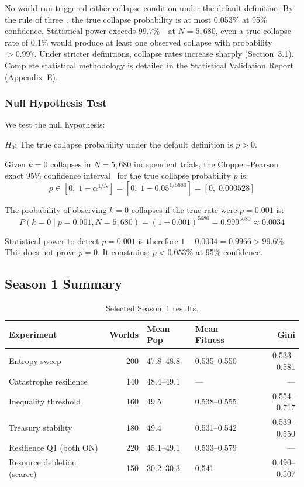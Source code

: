 \documentclass[11pt,a4paper]{article}
\begin{document}
No world-run triggered either collapse condition under the default definition. By the rule of three~\citep{jovanovic1997look}, the true collapse probability is at most 0.053\% at 95\% confidence. Statistical power exceeds 99.7\%---at $N = 5{,}680$, even a true collapse rate of 0.1\% would produce at least one observed collapse with probability $> 0.997$. Under stricter definitions, collapse rates increase sharply (Section~3.1). Complete statistical methodology is detailed in the Statistical Validation Report (Appendix~E).

\subsubsection{Null Hypothesis Test}

We test the null hypothesis:

\medskip
\noindent $H_0$: The true collapse probability under the default definition is $p > 0$.

\medskip
\noindent Given $k = 0$ collapses in $N = 5{,}680$ independent trials, the Clopper--Pearson exact 95\% confidence interval~\citep{clopper1934use} for the true collapse probability $p$ is:
\begin{equation}
  p \in [0,\; 1 - \alpha^{1/N}] = [0,\; 1 - 0.05^{1/5680}] = [0,\; 0.000528]
\end{equation}

The probability of observing $k = 0$ collapses if the true rate were $p = 0.001$ is:
\begin{equation}
  P(k = 0 \mid p = 0.001, N = 5{,}680) = (1 - 0.001)^{5680} = 0.999^{5680} \approx 0.0034
\end{equation}

Statistical power to detect $p = 0.001$ is therefore $1 - 0.0034 = 0.9966 > 99.6\%$. This does not prove $p = 0$. It constrains: $p < 0.053\%$ at 95\% confidence.

\subsection{Season 1 Summary}

\begin{table}[H]
\centering
\caption{Selected Season~1 results.}
\small
\begin{tabular}{@{}lrllr@{}}
\toprule
Experiment & Worlds & Mean Pop & Mean Fitness & Gini \\
\midrule
Entropy sweep & 200 & 47.8--48.8 & 0.535--0.550 & 0.533--0.581 \\
Catastrophe resilience & 140 & 48.4--49.1 & --- & --- \\
Inequality threshold & 160 & 49.5 & 0.538--0.555 & 0.554--0.717 \\
Treasury stability & 180 & 49.4 & 0.531--0.542 & 0.539--0.550 \\
Resilience Q1 (both ON) & 220 & 45.1--49.1 & 0.533--0.579 & --- \\
Resource depletion (scarce) & 150 & 30.2--30.3 & 0.541 & 0.490--0.507 \\
\bottomrule
\end{tabular}
\end{table}
\end{document}
